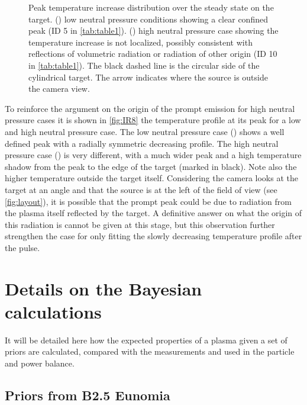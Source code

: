 \begin{figure}
\begin{subfigure}{0.6\linewidth}
        \vspace*{-5mm}
         {\color{white}\caption{\phantom{}}\label{fig:IR8b}}
     \end{subfigure}
        \caption{Peak temperature increase distribution over the steady state on the target. () low neutral pressure conditions showing a clear confined peak (ID 5 in \autoref{tab:table1}). () high neutral pressure case showing the temperature increase is not localized, possibly consistent with reflections of volumetric radiation or radiation of other origin (ID 10 in \autoref{tab:table1}). The black dashed line is the circular side of the cylindrical target. The arrow indicates where the source is outside the camera view.}
        \label{fig:IR8}
\end{figure}

To reinforce the argument on the origin of the prompt emission for high neutral pressure cases it is shown in \autoref{fig:IR8} the temperature profile at its peak for a low and high neutral pressure case. The low neutral pressure case () shows a well defined peak with a radially symmetric decreasing profile. The high neutral pressure case () is very different, with a much wider peak and a high temperature shadow from the peak to the edge of the target (marked in black). Note also the higher temperature outside the target itself. Considering the camera looks at the target at an angle and that the source is at the left of the field of view (see \autoref{fig:layout}), it is possible that the prompt peak could be due to radiation from the plasma itself reflected by the target. A definitive answer on what the origin of this radiation is cannot be given at this stage, but this observation further strengthen the case for only fitting the slowly decreasing temperature profile after the pulse.

\section{Details on the Bayesian calculations}\label{Details on the Bayesian calculations}

It will be detailed here how the expected properties of a plasma given a set of priors are calculated, compared with the measurements and used in the particle and power balance.

\subsection{Priors from B2.5 Eunomia}\label{Priors from B2.5 Eunomia}

